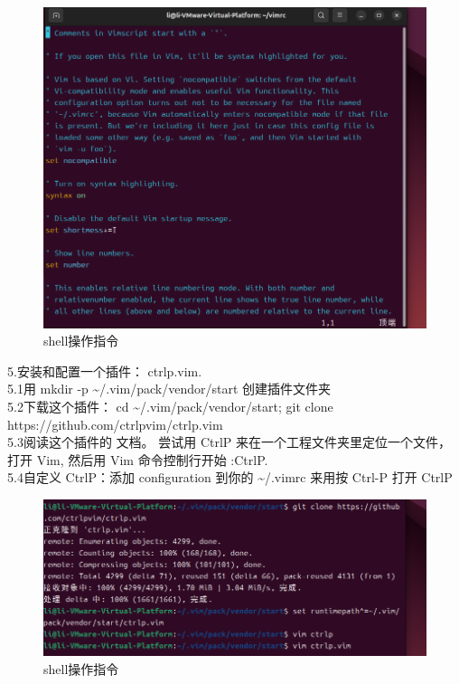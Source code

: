 \documentclass[a4paper, 12pt]{article}
\begin{document}
\begin{figure}[H]
  \centering
  \includegraphics[width=1\textwidth]{屏幕截图 2024-09-05 165235.png}
  \caption{shell操作指令}
    \end{figure}


\noindent 5.安装和配置一个插件： ctrlp.vim.\\
\indent 5.1用 mkdir -p \~{}/.vim/pack/vendor/start 创建插件文件夹\\
\indent 5.2下载这个插件： cd \~{}/.vim/pack/vendor/start; git clone https://github.com/ctrlpvim/ctrlp.vim\\
\indent 5.3阅读这个插件的 文档。 尝试用 CtrlP 来在一个工程文件夹里定位一个文件，打开 Vim, 然后用 Vim 命令控制行开始 :CtrlP.\\
\indent 5.4自定义 CtrlP：添加 configuration 到你的 \~{}/.vimrc 来用按 Ctrl-P 打开 CtrlP\\

\begin{figure}[H]
  \centering
  \includegraphics[width=1\textwidth]{屏幕截图 2024-09-05 170137.png}
  \caption{shell操作指令}
    \end{figure}
\end{document}
